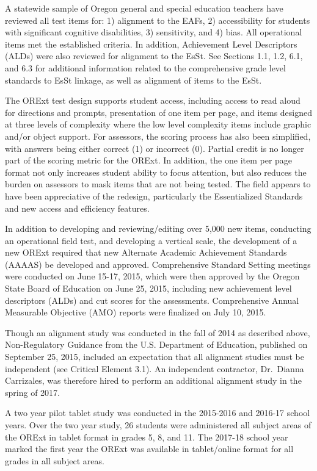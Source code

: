 \documentclass[]{article}
\begin{document}
A statewide sample of Oregon general and special education teachers have
reviewed all test items for: 1) alignment to the EAFs, 2) accessibility
for students with significant cognitive disabilities, 3) sensitivity,
and 4) bias. All operational items met the established criteria. In
addition, Achievement Level Descriptors (ALDs) were also reviewed for
alignment to the EsSt. See Sections 1.1, 1.2, 6.1, and 6.3 for
additional information related to the comprehensive grade level
standards to EsSt linkage, as well as alignment of items to the EsSt.

The ORExt test design supports student access, including access to read
aloud for directions and prompts, presentation of one item per page, and
items designed at three levels of complexity where the low level
complexity items include graphic and/or object support. For assessors,
the scoring process has also been simplified, with answers being either
correct (1) or incorrect (0). Partial credit is no longer part of the
scoring metric for the ORExt. In addition, the one item per page format
not only increases student ability to focus attention, but also reduces
the burden on assessors to mask items that are not being tested. The
field appears to have been appreciative of the redesign, particularly
the Essentialized Standards and new access and efficiency features.

In addition to developing and reviewing/editing over 5,000 new items,
conducting an operational field test, and developing a vertical scale,
the development of a new ORExt required that new Alternate Academic
Achievement Standards (AAAAS) be developed and approved. Comprehensive
Standard Setting meetings were conducted on June 15-17, 2015, which were
then approved by the Oregon State Board of Education on June 25, 2015,
including new achievement level descriptors (ALDs) and cut scores for
the assessments. Comprehensive Annual Measurable Objective (AMO) reports
were finalized on July 10, 2015.

Though an alignment study was conducted in the fall of 2014 as described
above, Non-Regulatory Guidance from the U.S. Department of Education,
published on September 25, 2015, included an expectation that all
alignment studies must be independent (see Critical Element 3.1). An
independent contractor, Dr.~Dianna Carrizales, was therefore hired to
perform an additional alignment study in the spring of 2017.

A two year pilot tablet study was conducted in the 2015-2016 and 2016-17
school years. Over the two year study, 26 students were administered all
subject areas of the ORExt in tablet format in grades 5, 8, and 11. The
2017-18 school year marked the first year the ORExt was available in
tablet/online format for all grades in all subject areas.
\end{document}
